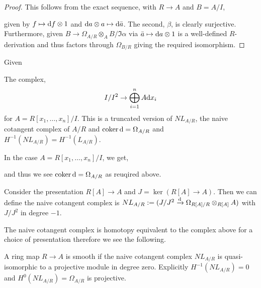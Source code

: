 \documentclass[12pt]{article}
\begin{document}
\begin{proof}
This follows from the exact sequence, with $R \to A$ and $B = A/I$,
\begin{center}
\end{center}
given by $f \mapsto \mathrm{d}{f} \otimes 1$ and $\mathrm{d}{a} \otimes a \mapsto \mathrm{d}{\bar{a}}$. The second, $\beta$, is clearly surjective. Furthermore, given $B \to \Omega_{A/R} \otimes_A B / \Im{\alpha}$ via $\bar{a} \mapsto \mathrm{d}{a} \otimes 1$ is a well-defined $R$-derivation and thus factors through $\Omega_{B/R}$ giving the required isomorphism.
\end{proof}

\begin{prop}
Given 
\end{prop}

\begin{rmk}
The complex,
\[ I/I^2 \to \bigoplus^n_{i = 1} A \mathrm{d}{x_i} \]
for $A = R[x_1, \dots, x_n]/I$. This is a truncated version of $NL_{A/R}$, the naive cotangent complex of $A/R$ and $\operatorname{\mathrm{coker}}{\mathrm{d}} = \Omega_{A/R}$ and $H^{-1}(NL_{A/R}) = H^{-1}(L_{A/R})$. 
\end{rmk}

\begin{rmk}
In the case $A = R[x_1, \dots, x_n]/I$, we get,
\begin{center}
\end{center}
and thus we see $\operatorname{\mathrm{coker}}{\mathrm{d}} = \Omega_{A/R}$ as reuqired above.
\end{rmk}

\begin{defn}
Consider the presentation $R[A] \to A$ and $J = \ker{(R[A] \to A)}$. Then we can define the naive cotangent complex is $NL_{A/R} := (J/J^2 \xrightarrow{\mathrm{d}} \Omega_{R[A]/R} \otimes_{R[A]} A)$ with $J/J^2$ in degree $-1$.
\end{defn}

\begin{rmk}
The naive cotangent complex is homotopy equivalent to the complex above for a choice of presentation therefore we see the following.
\end{rmk}

\begin{prop}
A ring map $R \to A$ is smooth if the naive cotangent complex $NL_{A/R}$ is quasi-isomorphic to a projective module in degree zero. Explicitly $H^{-1}(NL_{A/R}) = 0$ and $H^0(NL_{A/R}) = \Omega_{A/R}$ is projective.
\end{prop}
\end{document}
